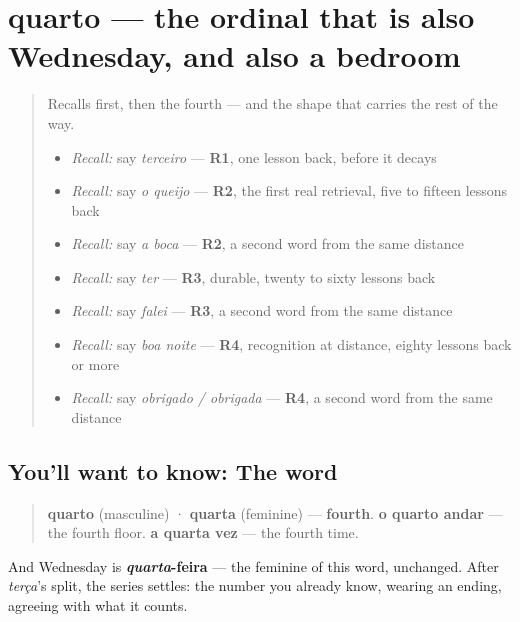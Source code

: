 \section[quarto / quarta]{quarto — the ordinal that is also Wednesday, and also a bedroom}

\label{lesson:PT-C27-quarto}



\begin{quote}
Recalls first, then the fourth — and the shape that carries the rest of the way.

\begin{itemize}
\raggedright
  \item \emph{Recall:} say \emph{terceiro} — \textbf{R1}, one lesson back, before it decays
  \item \emph{Recall:} say \emph{o queijo} — \textbf{R2}, the first real retrieval, five to fifteen lessons back
  \item \emph{Recall:} say \emph{a boca} — \textbf{R2}, a second word from the same distance
  \item \emph{Recall:} say \emph{ter} — \textbf{R3}, durable, twenty to sixty lessons back
  \item \emph{Recall:} say \emph{falei} — \textbf{R3}, a second word from the same distance
  \item \emph{Recall:} say \emph{boa noite} — \textbf{R4}, recognition at distance, eighty lessons back or more
  \item \emph{Recall:} say \emph{obrigado / obrigada} — \textbf{R4}, a second word from the same distance
\end{itemize}
\end{quote}

\subsection*{You'll want to know: The word}
\begin{quote}
\textbf{quarto} (masculine) · \textbf{quarta} (feminine) — \textbf{fourth}. \textbf{o quarto andar} — the fourth floor. \textbf{a quarta vez} — the fourth time.
\end{quote}

And Wednesday is \textbf{\emph{quarta}-feira} — the feminine of this word, unchanged. After \emph{terça}'s split, the series settles: the number you already know, wearing an ending, agreeing with what it counts.


